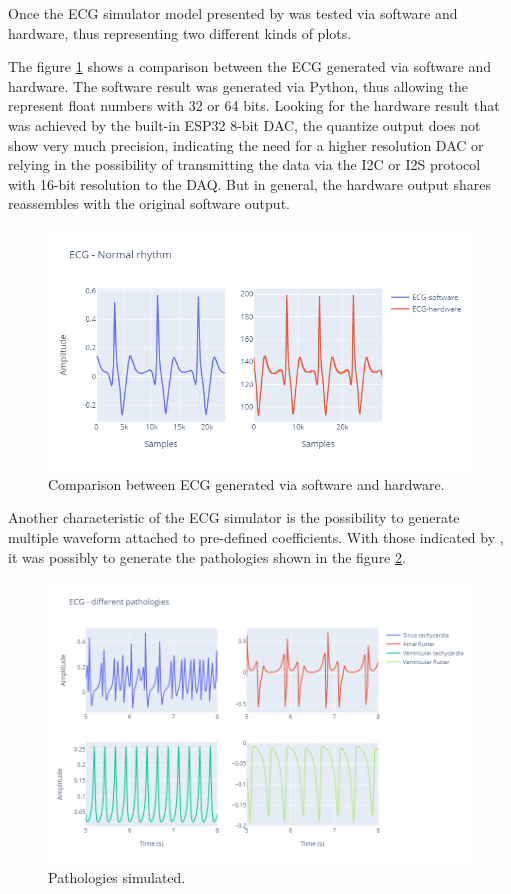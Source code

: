 Once the ECG simulator model presented by \textcite{quiroz2019generation} was tested via software and hardware, thus representing two different kinds of plots.

The figure \ref{fig:sim:1} shows a comparison between the ECG generated via software and hardware. The software result was generated via Python, thus allowing the represent float numbers with 32 or 64 bits. Looking for the hardware result that was achieved by the built-in ESP32 8-bit DAC, the quantize output does not show very much precision, indicating the need for a higher resolution DAC or relying in the possibility of transmitting the data via the I2C or I2S protocol with 16-bit resolution to the DAQ. But in general, the hardware output shares reassembles with the original software output.

\begin{figure}[h!] 
    \centering
    \includegraphics[width=\textwidth]{images/Simulator/simulator1.png}
    \caption{Comparison between ECG generated via software and hardware.}
    \label{fig:sim:1}
\end{figure}

Another characteristic of the ECG simulator is the possibility to generate multiple waveform attached to pre-defined coefficients. With those indicated by \textcite{quiroz2019generation}, it was possibly to generate the pathologies shown in the figure \ref{fig:sim:2}.

\begin{figure}[h!] 
    \centering
    \includegraphics[width=\textwidth]{images/Simulator/simulator2.png}
    \caption{Pathologies simulated.}
    \label{fig:sim:2}
\end{figure}

